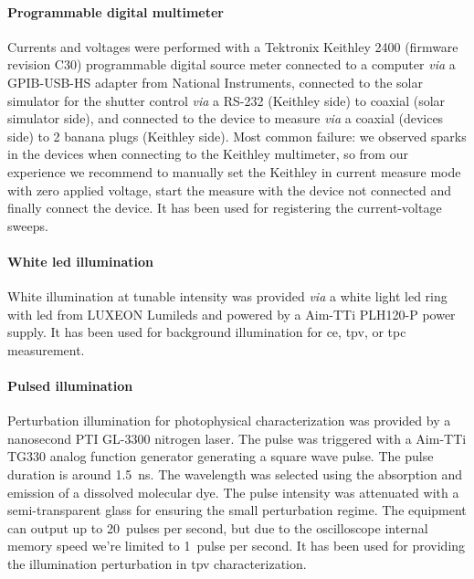 		\paragraph{Programmable digital multimeter}
		Currents and voltages were performed with a Tektronix Keithley 2400 (firmware revision C30) programmable digital source meter connected to a computer \textsl{via} a GPIB-USB-HS adapter from National Instruments, connected to the solar simulator for the shutter control \textsl{via} a RS-232 (Keithley side) to coaxial (solar simulator side), and connected to the device to measure \textsl{via} a coaxial (devices side) to 2 banana plugs (Keithley side).
		Most common failure: we observed sparks in the devices when connecting to the Keithley multimeter, so from our experience we recommend to manually set the Keithley in current measure mode with zero applied voltage, start the measure with the device not connected and finally connect the device.
		It has been used for registering the current-voltage sweeps.

		\paragraph{White \gls{led} illumination}
		White illumination at tunable intensity was provided \textsl{via} a white light \gls{led} ring with \gls{led} from LUXEON Lumileds and powered by a Aim-TTi PLH120-P power supply.
		It has been used for background illumination for \acrfull{ce}, \acrfull{tpv}, or \acrfull{tpc} measurement.

		\paragraph{Pulsed illumination}
		Perturbation illumination for photophysical characterization was provided by a nanosecond PTI GL-3300 nitrogen laser.
		The pulse was triggered with a Aim-TTi TG330 analog function generator generating a square wave pulse.
		The pulse duration is around \SI{1.5}{\ns}.
		The wavelength was selected using the absorption and emission of a dissolved molecular dye.
		The pulse intensity was attenuated with a semi-transparent glass for ensuring the small perturbation regime.
		The equipment can output up to 20~pulses per second, but due to the oscilloscope internal memory speed we're limited to 1~pulse per second.
		It has been used for providing the illumination perturbation in \acrshort{tpv} characterization.

